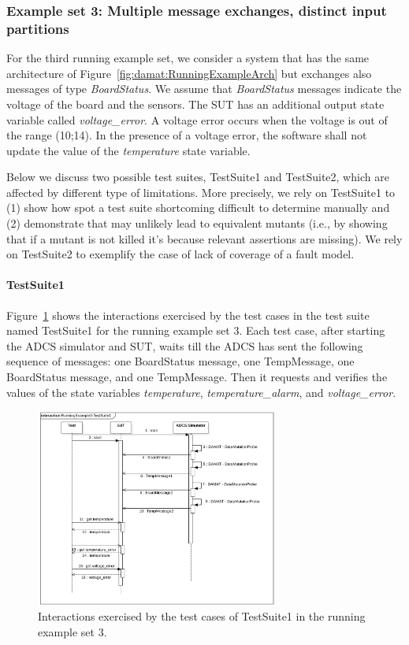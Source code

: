 \clearpage
\subsubsection{Example set 3: Multiple message exchanges, distinct input partitions}
\label{sec:dataDriven:example:3}

For the third running example set, we consider a system that has the same architecture of  Figure~\ref{fig:damat:RunningExampleArch} but exchanges also messages of type \emph{BoardStatus}. We assume that \emph{BoardStatus} messages indicate the voltage of the board and the sensors. The SUT has an additional output state variable called \emph{voltage\_error}. A voltage error occurs when the voltage is out of the range (10;14). In the presence of a voltage error, the software shall not update the value of the \emph{temperature} state variable.

Below we discuss two possible test suites, TestSuite1 and TestSuite2, which are affected by different type of limitations.
More precisely, we rely on TestSuite1 to (1) show how \APPR spot a test suite shortcoming difficult to determine manually and (2) demonstrate that \APPR may unlikely lead to equivalent mutants (i.e., by showing that if a mutant is not killed it's because relevant assertions are missing). We rely on TestSuite2 to exemplify the case of lack of coverage of a fault model.

\paragraph{TestSuite1}

Figure~\ref{fig:damat:RunningExample3Sequence} shows the interactions exercised by the test cases in the test suite named TestSuite1 for the running example set 3. Each test case, after starting the ADCS simulator and SUT, waits till the ADCS has sent the following sequence of messages: one BoardStatus message, one TempMessage, one BoardStatus message, and one TempMessage. Then it requests and verifies the values of the state variables \emph{temperature}, \emph{temperature\_alarm}, and \emph{voltage\_error}.

\begin{figure}[tb]
\centering
\includegraphics[width=8cm]{damat/images/RunningExampleSequence3.png}
\caption{Interactions exercised by the test cases of TestSuite1 in the running example set 3.}
\label{fig:damat:RunningExample3Sequence}
\end{figure}

